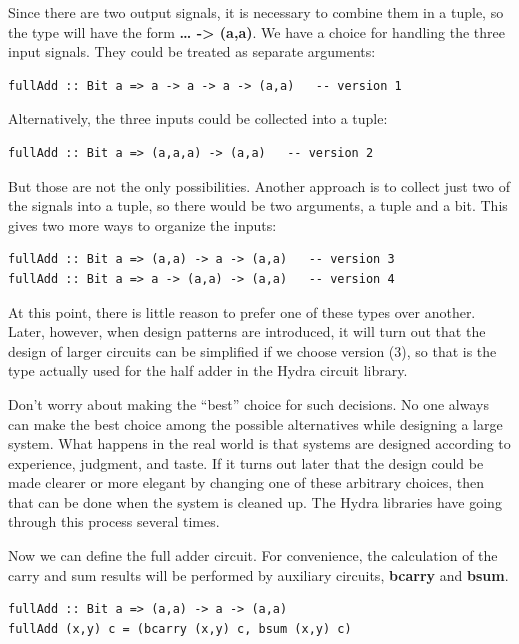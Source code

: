 \documentclass[]{svmono}
\begin{document}
Since there are two output signals, it is necessary to combine them in
a tuple, so the type will have the form \textbf{\ldots{} -> (a,a)}.  We have a
choice for handling the three input signals.  They could be treated as
separate arguments:

\begin{verbatim}
fullAdd :: Bit a => a -> a -> a -> (a,a)   -- version 1
\end{verbatim}

Alternatively, the three inputs could be collected into a tuple:

\begin{verbatim}
fullAdd :: Bit a => (a,a,a) -> (a,a)   -- version 2
\end{verbatim}

But those are not the only possibilities.  Another approach is to
collect just two of the signals into a tuple, so there would be two
arguments, a tuple and a bit.  This gives two more ways to organize
the inputs:


\begin{verbatim}
fullAdd :: Bit a => (a,a) -> a -> (a,a)   -- version 3
fullAdd :: Bit a => a -> (a,a) -> (a,a)   -- version 4
\end{verbatim}



At this point, there is little reason to prefer one of these types
over another.  Later, however, when design patterns are introduced, it
will turn out that the design of larger circuits can be simplified if
we choose version (3), so that is the type actually used for the half
adder in the Hydra circuit library.

Don't worry about making the ``best'' choice for such decisions.  No
one always can make the best choice among the possible alternatives
while designing a large system.  What happens in the real world is
that systems are designed according to experience, judgment, and
taste.  If it turns out later that the design could be made clearer or
more elegant by changing one of these arbitrary choices, then that can
be done when the system is cleaned up.  The Hydra libraries have going
through this process several times.

Now we can define the full adder circuit.  For convenience, the
calculation of the carry and sum results will be performed by
auxiliary circuits, \textbf{bcarry} and \textbf{bsum}.


\begin{verbatim}
fullAdd :: Bit a => (a,a) -> a -> (a,a)
fullAdd (x,y) c = (bcarry (x,y) c, bsum (x,y) c)
\end{verbatim}
\end{document}
